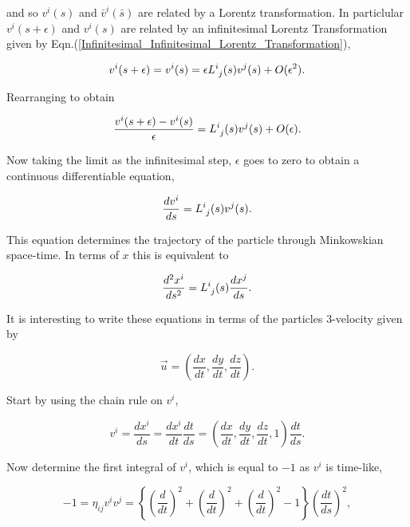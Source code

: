 \noindent and so $v^i(s)$ and $\bar{v}^i(\bar{s})$ are related by a Lorentz transformation. In particlular $v^i(s+\epsilon)$ and $v^i(s)$ are related by an infinitesimal Lorentz Transformation given by Eqn.(\ref{Infinitesimal_Infinitesimal_Lorentz_Transformation}),

\begin{equation}
v^i(s+\epsilon) = v^i(s) = \epsilon \tensor{L}{^{i}_{j}}(s)v^j (s) + O(\epsilon^2).
\end{equation}

\noindent Rearranging to obtain

\begin{equation}
\frac{v^i(s+\epsilon) - v^i(s)}{\epsilon} = \tensor{L}{^{i}_{j}}(s)v^j (s) + O(\epsilon).
\end{equation}

\noindent Now taking the limit as the infinitesimal step, $\epsilon$ goes to zero to obtain a continuous differentiable equation,

\begin{equation}\label{Infinitesimal_DE_interms_v}
\frac{dv^i}{ds} = \tensor{L}{^{i}_{j}}(s) v^j (s).
\end{equation}

\noindent This equation determines the trajectory of the particle through Minkowskian space-time. In terms of $x$ this is equivalent to

\begin{equation*}
\frac{d^2 x^i}{ds^2} = \tensor{L}{^{i}_{j}}(s) \frac{d x^j}{ds}.
\end{equation*}

It is interesting to write these equations in terms of the particles $3$-velocity given by

\begin{equation*}
\vec{u} = \left( \frac{dx}{dt}, \frac{dy}{dt}, \frac{dz}{dt} \right).
\end{equation*}

\noindent Start by using the chain rule on $v^i$,

\begin{equation*}\label{Infinitesimal_Chain_Rule}
v^i = \frac{dx^i}{ds} = \frac{dx^i}{dt} \frac{dt}{ds} = \left(\frac{dx}{dt},\frac{dy}{dt},\frac{dz}{dt},1\right) \frac{dt}{ds}.
\end{equation*}

\noindent Now determine the first integral of $v^i$, which is equal to $-1$ as $v^i$ is time-like,

\begin{equation*} 
-1 = \eta_{ij} v^i v^j =  \left\{ \left( \frac{d}{dt} \right)^2  + \left( \frac{d}{dt} \right)^2  + \left( \frac{d}{dt} \right)^2 - 1  \right\} \left( \frac{dt}{ds} \right)^2,
\end{equation*} 


